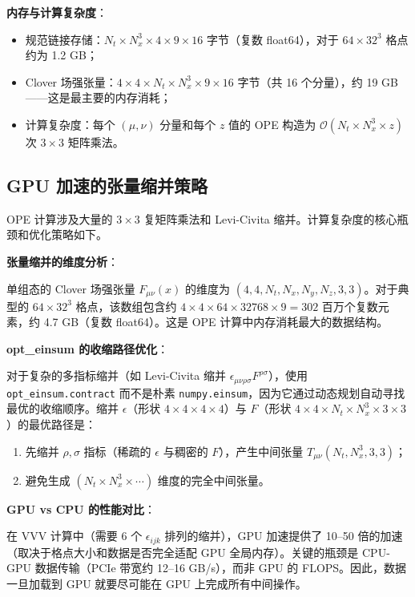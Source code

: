 \documentclass[11pt,a4paper]{ctexart}
\newcommand{\order}[1]{\mathcal{O}(#1)}
\begin{document}
\textbf{内存与计算复杂度}：
\begin{itemize}
  \item 规范链接存储：$N_t \times N_x^3 \times 4 \times 9 \times 16$ 字节（复数 float64），对于 $64 \times 32^3$ 格点约为 1.2 GB；
  \item Clover 场强张量：$4 \times 4 \times N_t \times N_x^3 \times 9 \times 16$ 字节（共 16 个分量），约 19 GB——这是最主要的内存消耗；
  \item 计算复杂度：每个 $(\mu,\nu)$ 分量和每个 $z$ 值的 OPE 构造为 $\order{N_t \times N_x^3 \times z}$ 次 $3\times3$ 矩阵乘法。
\end{itemize}

\subsection{GPU 加速的张量缩并策略}

OPE 计算涉及大量的 $3\times 3$ 复矩阵乘法和 Levi-Civita 缩并。计算复杂度的核心瓶颈和优化策略如下。

\textbf{张量缩并的维度分析}：

单组态的 Clover 场强张量 $F_{\mu\nu}(x)$ 的维度为 $(4,4,N_t,N_x,N_y,N_z,3,3)$。对于典型的 $64\times 32^3$ 格点，该数组包含约 $4\times4\times64\times32768\times9=302$ 百万个复数元素，约 4.7 GB（复数 float64）。这是 OPE 计算中内存消耗最大的数据结构。

\textbf{opt\_einsum 的收缩路径优化}：

对于复杂的多指标缩并（如 Levi-Civita 缩并 $\epsilon_{\mu\nu\rho\sigma} F^{\rho\sigma}$），使用 \texttt{opt\_einsum.contract} 而不是朴素 \texttt{numpy.einsum}，因为它通过动态规划自动寻找最优的收缩顺序。缩并 $\epsilon$（形状 $4\times4\times4\times4$）与 $F$（形状 $4\times4\times N_t\times N_x^3\times 3\times 3$）的最优路径是：
\begin{enumerate}
  \item 先缩并 $\rho,\sigma$ 指标（稀疏的 $\epsilon$ 与稠密的 $F$），产生中间张量 $T_{\mu\nu}(N_t, N_x^3, 3, 3)$；
  \item 避免生成 $(N_t\times N_x^3\times \cdots)$ 维度的完全中间张量。
\end{enumerate}

\textbf{GPU vs CPU 的性能对比}：

在 VVV 计算中（需要 6 个 $\epsilon_{ijk}$ 排列的缩并），GPU 加速提供了 10--50 倍的加速（取决于格点大小和数据是否完全适配 GPU 全局内存）。关键的瓶颈是 CPU-GPU 数据传输（PCIe 带宽约 12--16 GB/s），而非 GPU 的 FLOPS。因此，数据一旦加载到 GPU 就要尽可能在 GPU 上完成所有中间操作。
\end{document}
